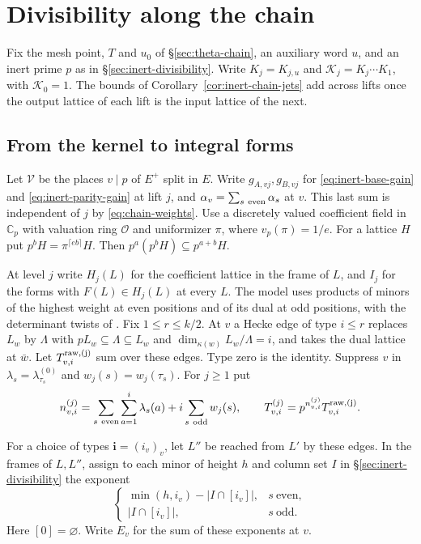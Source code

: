 \section{Divisibility along the chain}\label{sec:chain-divisibility}

Fix the mesh point, $T$ and $u_0$ of \S\ref{sec:theta-chain}, an
auxiliary word $u$, and an inert prime $p$ as in \S\ref{sec:inert-divisibility}.
Write $K_j=K_{j,u}$ and $\mathcal K_j=K_j\cdots K_1$, with
$\mathcal K_0=1$. The bounds of Corollary~\ref{cor:inert-chain-jets}
add across lifts once the output lattice of each lift is the input
lattice of the next.

\subsection{From the kernel to integral forms}

Let $\mathcal V$ be the places $v\mid p$ of $E^+$ split in $E$.
Write $g_{A,vj},g_{B,vj}$ for \eqref{eq:inert-base-gain} and
\eqref{eq:inert-parity-gain} at lift $j$, and
$\alpha_v=\sum_{s\ {\rm even}}\alpha_s$ at $v$. This last sum is
independent of $j$ by \eqref{eq:chain-weights}. Use a discretely
valued coefficient field in $\mathbb C_p$ with valuation ring
$\mathcal O$ and uniformizer $\pi$, where $v_p(\pi)=1/e$.
For a lattice $H$ put $p^bH=\pi^{\lceil eb\rceil}H$. Then
$p^a(p^bH)\subseteq p^{a+b}H$.

At level $j$ write $H_j(L)$ for the coefficient lattice in the frame
of $L$, and $I_j$ for the forms with $F(L)\in H_j(L)$ at every $L$.
The model uses products of minors of the highest weight at even
positions and of its dual at odd positions, with the determinant
twists of \citep[Definition~11.3]{adriazola-grh}. Fix $1\le r\le k/2$.
At $v$ a Hecke edge of type $i\le r$ replaces $L_w$ by $\Lambda$ with
$pL_w\subseteq\Lambda\subseteq L_w$ and
$\dim_{\kappa(w)}L_w/\Lambda=i$, and takes the dual lattice at $\bar w$.
Let $T^{\rm raw,(j)}_{v,i}$ sum over these edges. Type zero is the identity.
Suppress $v$ in $\lambda_s=\lambda^{(0)}_{\tau_s}$ and $w_j(s)=w_j(\tau_s)$.
For $j\ge1$ put
\[
 n^{(j)}_{v,i}=\sum_{s\ {\rm even}}\sum_{a=1}^{i}\lambda_s(a)
                   +i\sum_{s\ {\rm odd}}w_j(s),\qquad
 T^{(j)}_{v,i}=p^{n^{(j)}_{v,i}}T^{\rm raw,(j)}_{v,i}.
\]

For a choice of types $\mathbf i=(i_v)_v$, let $L''$ be reached from
$L'$ by these edges. In the frames of $L,L''$, assign to each minor
of height $h$ and column set $I$ in \S\ref{sec:inert-divisibility} the exponent
\[
 \begin{cases}
 \min(h,i_v)-|I\cap[i_v]|,&s\ \text{even},\\
 |I\cap[i_v]|,&s\ \text{odd}.
 \end{cases}
\]
Here $[0]=\varnothing$. Write $E_v$ for the sum of these exponents at $v$.

